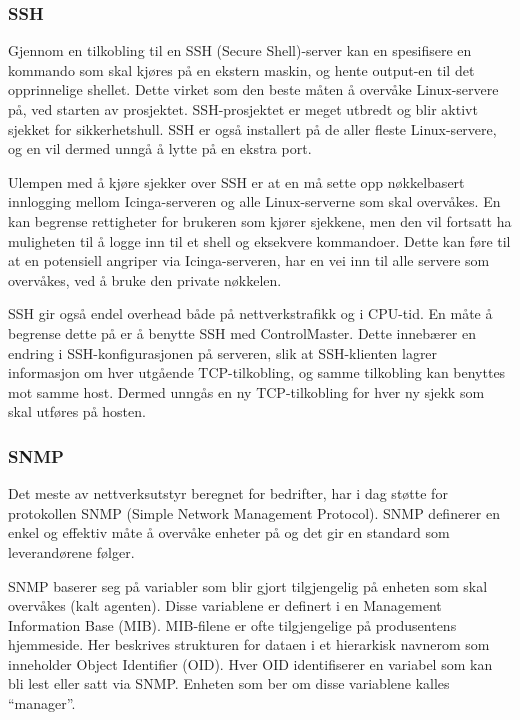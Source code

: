 \subsubsection{SSH}
Gjennom en tilkobling til en SSH (Secure Shell)-server kan en spesifisere en kommando som skal kjøres på en ekstern maskin, og hente output-en til det opprinnelige shellet. Dette virket som den beste måten å overvåke Linux-servere på, ved starten av prosjektet. SSH-prosjektet er meget utbredt og blir aktivt sjekket for sikkerhetshull. SSH er også installert på de aller fleste Linux-servere, og en vil dermed unngå å lytte på en ekstra port.

Ulempen med å kjøre sjekker over SSH er at en må sette opp nøkkelbasert innlogging mellom Icinga-serveren og alle Linux-serverne som skal overvåkes. En kan begrense rettigheter for brukeren som kjører sjekkene, men den vil fortsatt ha muligheten til å logge inn til et shell og eksekvere kommandoer. Dette kan føre til at en potensiell angriper via Icinga-serveren, har en vei inn til alle servere som overvåkes, ved å bruke den private nøkkelen.

SSH gir også endel overhead både på nettverkstrafikk og i CPU-tid\cite{sshmanpage}. En måte å begrense dette på er å benytte SSH med ControlMaster. Dette innebærer en endring i SSH-konfigurasjonen på serveren, slik at SSH-klienten lagrer informasjon om hver utgående TCP-tilkobling, og samme tilkobling kan benyttes mot samme host. Dermed unngås en ny TCP-tilkobling for hver ny sjekk som skal utføres på hosten.

\subsubsection{SNMP}
Det meste av nettverksutstyr beregnet for bedrifter, har i dag støtte for protokollen SNMP (Simple Network Management Protocol\cite{essentialsnmp}). SNMP definerer en enkel og effektiv måte å overvåke enheter på og det gir en standard som leverandørene følger.
	
SNMP baserer seg på variabler som blir gjort tilgjengelig på enheten som skal overvåkes (kalt agenten). Disse variablene er definert i en Management Information Base (MIB). MIB-filene er ofte tilgjengelige på produsentens hjemmeside. Her beskrives strukturen for dataen i et hierarkisk navnerom som inneholder Object Identifier (OID). Hver OID identifiserer en variabel som kan bli lest eller satt via SNMP. Enheten som ber om disse variablene kalles ``manager''. 

